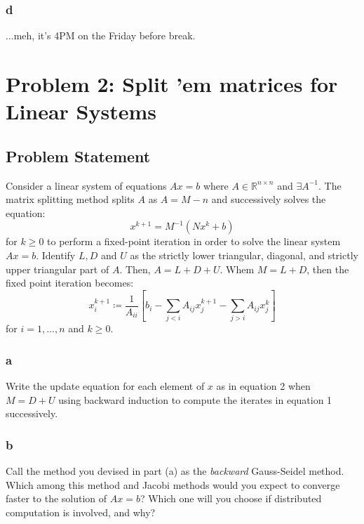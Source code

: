 \documentclass[11pt]{report}
\theoremstyle{definition}
\begin{document}
\subsubsection*{d}
...meh, it's 4PM on the Friday before break.

\newpage

\section*{Problem 2: Split 'em matrices for Linear Systems}
\subsection*{Problem Statement}
Consider a linear system of equations $Ax=b$ where $A\in\mathbb{R}^{n\times n}$
and $\exists A^{-1}$. The matrix splitting method splits $A$ as $A=M-n$ and
successively solves the equation:
\begin{equation}
	x^{k+1}=M^{-1}\left(Nx^k+b\right)
\end{equation}
for $k\geq 0$ to perform a fixed-point iteration in order to solve the linear system $Ax=b$. Identify $L,D$ and $U$ as the strictly lower triangular, diagonal, and strictly upper triangular part of $A$. Then, $A=L+D+U$. Whem $M=L+D$, then the fixed point iteration becomes:
\begin{equation}
	x_i^{k+1}\coloneqq \frac{1}{A_{ii}}\left[
	b_i - \sum_{j<i}A_{ij}x_{j}^{k+1}-\sum_{j>i}A_{ij}x_j^k
	\right]
\end{equation}
for $i=1,\ldots,n$ and $k\geq 0$.
\subsubsection*{a}
Write the update equation for each element of $x$ as in equation 2 when $M=D+U$ using
backward induction to compute the iterates in equation 1 successively.

\subsubsection*{b}
Call the method you devised in part (a) as the \textit{backward} Gauss-Seidel
method. Which among this method and Jacobi methods would you expect to converge
faster to the solution of $Ax=b$? Which one will you choose if distributed
computation is involved, and why?
\end{document}
